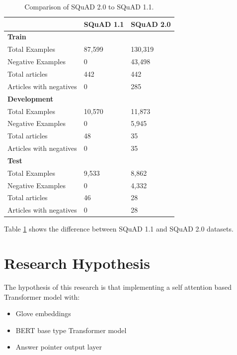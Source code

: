 \documentclass[a4paper,12pt]{report}
\begin{document}
		\begin{table}[h!]
		              \centering
		                \begin{tabular}{|l|l|l|}
		                    \hline
		                     & SQuAD 1.1 &  SQuAD 2.0 \\
		                    \hline
		                    \textbf{Train} & & \\
		                        Total Examples & 87,599 &  130,319 \\
		                        Negative Examples & 0 & 43,498 \\
		                        Total articles & 442 & 442 \\
		                        Articles with negatives & 0 & 285 \\
		                    \hline
		                    \textbf{Development} & & \\
		                        Total Examples & 10,570 &  11,873 \\
		                        Negative Examples & 0 & 5,945 \\
		                        Total articles & 48 & 35 \\
		                        Articles with negatives & 0 & 35 \\
		                    \hline
		                    \textbf{Test} &  & \\
		                        Total Examples & 9,533 & 8,862 \\
		                        Negative Examples & 0 & 4,332 \\
		                        Total articles & 46 & 28 \\
		                        Articles with negatives & 0 & 28 \\
		                    \hline
		                \end{tabular}
		                \caption{Comparison of  SQuAD 2.0 to SQuAD 1.1\citep{dataset}.}\label{datasetDescription}
		 \end{table}

    Table \ref{datasetDescription} shows the difference between SQuAD 1.1 and SQuAD 2.0 datasets. 
   
    \section{Research Hypothesis}\label{c33}
    The hypothesis of this research is that implementing a self attention based Transformer model with:
    \begin{itemize}
    	\item Glove embeddings
    	\item BERT base \citep{bert} type Transformer model 
    	\item Answer pointer output layer\citep{lstmPointer, lstmhu2016question}
    \end{itemize}
\end{document}
